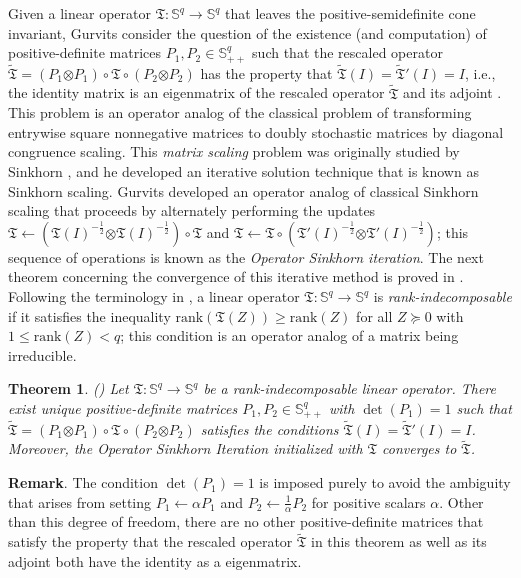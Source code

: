 \documentclass[11pt,letterpaper]{article}
\newtheorem{theorem}{Theorem}
\newcommand{\T}{\mathfrak{T}}
\renewcommand{\S}{\mathbb{S}}
\newcommand{\botimes}{\boldsymbol \otimes}
\begin{document}
Given a linear operator $\T : \S^q \rightarrow \S^q$ that leaves the positive-semidefinite cone invariant, Gurvits consider the question of the existence (and computation) of positive-definite matrices $P_1,P_2 \in \S^q_{++}$ such that the rescaled operator $\tilde{\T} = (P_1 \botimes P_1) \circ \T \circ (P_2 \botimes P_2)$ has the property that $\tilde{\T}(I) = \tilde{\T}'(I) = I$, i.e., the identity matrix is an eigenmatrix of the rescaled operator $\tilde{\T}$ and its adjoint \cite{Gur:04}.  This problem is an operator analog of the classical problem of transforming entrywise square nonnegative matrices to doubly stochastic matrices by diagonal congruence scaling.  This \emph{matrix scaling} problem was originally studied by Sinkhorn \cite{Sin:64}, and he developed an iterative solution technique that is known as Sinkhorn scaling.   Gurvits developed an operator analog of classical Sinkhorn scaling that proceeds by alternately performing the updates $\T \leftarrow \left(\T(I)^{-\tfrac{1}{2}} \botimes \T(I)^{-\tfrac{1}{2}} \right) \circ \T$ and $\T \leftarrow \T \circ \left(\T'(I)^{-\tfrac{1}{2}} \botimes \T'(I)^{-\tfrac{1}{2}} \right)$; this sequence of operations is known as the \emph{Operator Sinkhorn iteration}.  The next theorem concerning the convergence of this iterative method is proved in \cite{Gur:04}.  Following the terminology in \cite{Gur:04}, a linear operator $\T : \S^q \rightarrow \S^q$ is \emph{rank-indecomposable} if it satisfies the inequality $\mathrm{rank}\left(\T(Z) \right) \geq \mathrm{rank}(Z)$ for all $Z \succeq 0$ with $1 \leq \mathrm{rank}(Z) < q$; this condition is an operator analog of a matrix being irreducible.

\begin{theorem} (\cite[Theorem 4.6 and 4.7]{Gur:04}) \label{thm:external_osiconverges}
Let $\T : \S^q \rightarrow \S^q$ be a rank-indecomposable linear operator.  There exist \emph{unique} positive-definite matrices $P_1, P_2 \in \S^q_{++}$ with $\det(P_1) = 1$ such that $\tilde{\T} = (P_1 \botimes P_1) \circ \T \circ (P_2 \botimes P_2)$ satisfies the conditions $\tilde{\T}(I) = \tilde{\T}'(I) = I$.  Moreover, the Operator Sinkhorn Iteration initialized with $\T$ converges to $\tilde{\T}$.
\end{theorem}

\noindent \textbf{Remark}. The condition $\det(P_1) = 1$ is imposed purely to avoid the ambiguity that arises from setting $P_1 \leftarrow \alpha P_1$ and $P_2 \leftarrow \tfrac{1}{\alpha} P_2$ for positive scalars $\alpha$.  Other than this degree of freedom, there are no other positive-definite matrices that satisfy the property that the rescaled operator $\tilde{\T}$ in this theorem as well as its adjoint both have the identity as a eigenmatrix.
\end{document}
